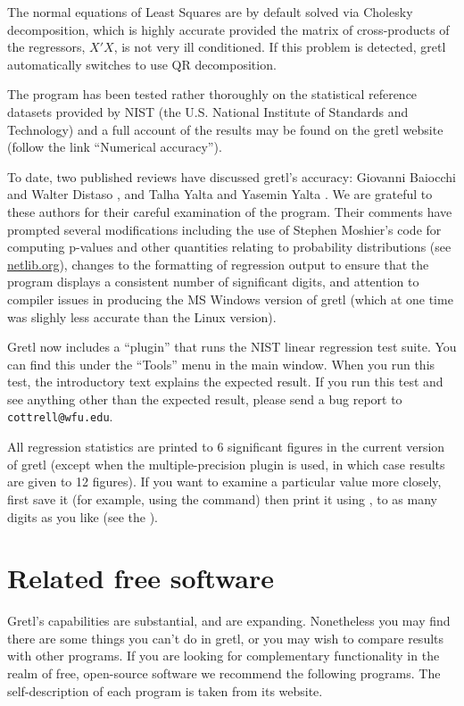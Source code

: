 The normal equations of Least Squares are by default solved via
Cholesky decomposition, which is highly accurate provided the matrix
of cross-products of the regressors, $X'X$, is not very ill
conditioned.  If this problem is detected, gretl automatically
switches to use QR decomposition.

The program has been tested rather thoroughly on the statistical
reference datasets provided by NIST (the U.S.  National Institute of
Standards and Technology) and a full account of the results may be
found on the gretl website (follow the link ``Numerical accuracy'').

To date, two published reviews have discussed gretl's accuracy:
Giovanni Baiocchi and Walter Distaso \citeyearpar{baiocchi03}, and
Talha Yalta and Yasemin Yalta \citeyearpar{yalta07}.  We are grateful
to these authors for their careful examination of the program.  Their
comments have prompted several modifications including the use of
Stephen Moshier's  code for computing p-values and other
quantities relating to probability distributions (see
\href{http://www.netlib.org/cephes/}{netlib.org}), changes to the
formatting of regression output to ensure that the program displays a
consistent number of significant digits, and attention to compiler
issues in producing the MS Windows version of gretl (which at
one time was slighly less accurate than the Linux version).

Gretl now includes a ``plugin'' that runs the NIST linear
regression test suite.  You can find this under the ``Tools'' menu in
the main window.  When you run this test, the introductory text
explains the expected result.  If you run this test and see anything
other than the expected result, please send a bug report to
\verb+cottrell@wfu.edu+.

All regression statistics are printed to 6 significant figures in the
current version of gretl (except when the multiple-precision
plugin is used, in which case results are given to 12 figures).  If
you want to examine a particular value more closely, first save it
(for example, using the  command) then print it using
, to as many digits as you like (see the \GCR).  

\chapter{Related free software}
\label{app-advanced}

Gretl's capabilities are substantial, and are expanding.
Nonetheless you may find there are some things you can't do in
gretl, or you may wish to compare results with other programs.
If you are looking for complementary functionality in the realm of
free, open-source software we recommend the following programs.  The
self-description of each program is taken from its website.


